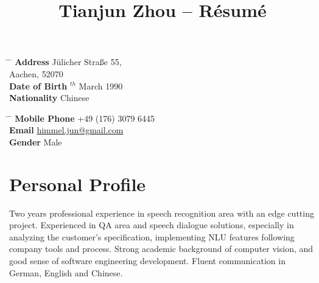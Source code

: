 \documentclass[10pt]{article} %
\begin{document}

\title{Tianjun Zhou -- Résumé} %


\parbox{0.5\textwidth}{ %
\begin{tabbing} %
\hspace{3cm} \= \hspace{4cm} \= \kill %
{\bf Address} \> J\"ulicher Stra\ss e 55,\\ %
\> Aachen, 52070 \\ %
{\bf Date of Birth} $^{th}$ March 1990 \\ %
{\bf Nationality} \> Chinese %
\end{tabbing}}
\hfill %
\parbox{0.5\textwidth}{ %
\begin{tabbing} %
\hspace{3cm} \= \hspace{4cm} \= \kill %
{\bf Mobile Phone} \> +49 (176) 3079 6445 \\ %
{\bf Email} \> \href{mailto:himmel.jun@gmail.com}{himmel.jun@gmail.com} \\ %
{\bf Gender} \> Male \\
\end{tabbing}}


\section{Personal Profile}

Two years professional experience in speech recognition area with an edge cutting project. Experienced in QA area and speech dialogue solutions, especially in analyzing the customer's specification, implementing NLU features following company tools and process. Strong academic background of computer vision, and good sense of software engineering development. Fluent communication in German, English and Chinese. 
\end{document}
